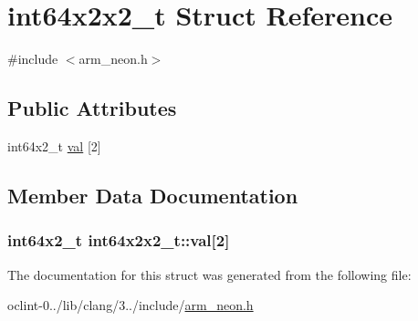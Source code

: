 \hypertarget{structint64x2x2__t}{\section{int64x2x2\-\_\-t Struct Reference}
\label{structint64x2x2__t}
}


{\ttfamily \#include $<$arm\-\_\-neon.\-h$>$}

\subsection*{Public Attributes}
\begin{DoxyCompactItemize}
\item 
int64x2\-\_\-t \hyperlink{structint64x2x2__t_a27a80511f7775975ca7415ff07048d2a}{val} \mbox{[}2\mbox{]}
\end{DoxyCompactItemize}


\subsection{Member Data Documentation}
\hypertarget{structint64x2x2__t_a27a80511f7775975ca7415ff07048d2a}{
\subsubsection[{val}]{\setlength{\rightskip}{0pt plus 5cm}int64x2\-\_\-t int64x2x2\-\_\-t\-::val\mbox{[}2\mbox{]}}}\label{structint64x2x2__t_a27a80511f7775975ca7415ff07048d2a}


The documentation for this struct was generated from the following file\-:\begin{DoxyCompactItemize}
\item 
oclint-\/0../lib/clang/3../include/\hyperlink{arm__neon_8h}{arm\-\_\-neon.\-h}\end{DoxyCompactItemize}
